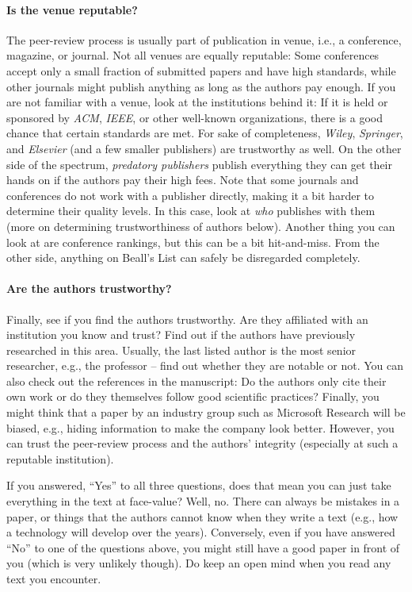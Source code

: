 \documentclass[a4paper]{article}
\begin{document}
\paragraph{Is the venue reputable?}
The peer-review process is usually part of publication in venue, i.e., a conference, magazine, or journal.
Not all venues are equally reputable:
Some conferences accept only a small fraction of submitted papers and have high standards, while other journals might publish anything as long as the authors pay enough.
If you are not familiar with a venue, look at the institutions behind it:
If it is held or sponsored by \emph{ACM}, \emph{IEEE}, or other well-known organizations, there is a good chance that certain standards are met.
For sake of completeness, \emph{Wiley}, \emph{Springer}, and \emph{Elsevier} (and a few smaller publishers) are trustworthy as well.
On the other side of the spectrum, \emph{predatory publishers} publish everything they can get their hands on if the authors pay their high fees.
Note that some journals and conferences do not work with a publisher directly, making it a bit harder to determine their quality levels.
In this case, look at \emph{who} publishes with them (more on determining trustworthiness of authors below).
Another thing you can look at are conference rankings, but this can be a bit hit-and-miss.
From the other side, anything on Beall's List can safely be disregarded completely.

\paragraph{Are the authors trustworthy?}
Finally, see if you find the authors trustworthy.
Are they affiliated with an institution you know and trust?
Find out if the authors have previously researched in this area.
Usually, the last listed author is the most senior researcher, e.g., the professor -- find out whether they are notable or not.
You can also check out the references in the manuscript:
Do the authors only cite their own work or do they themselves follow good scientific practices?
Finally, you might think that a paper by an industry group such as Microsoft Research will be biased, e.g., hiding information to make the company look better.
However, you can trust the peer-review process and the authors' integrity (especially at such a reputable institution).

If you answered, ``Yes'' to all three questions, does that mean you can just take everything in the text at face-value?
Well, no.
There can always be mistakes in a paper, or things that the authors cannot know when they write a text (e.g., how a technology will develop over the years).
Conversely, even if you have answered ``No'' to one of the questions above, you might still have a good paper in front of you (which is very unlikely though).
Do keep an open mind when you read any text you encounter.
\end{document}
